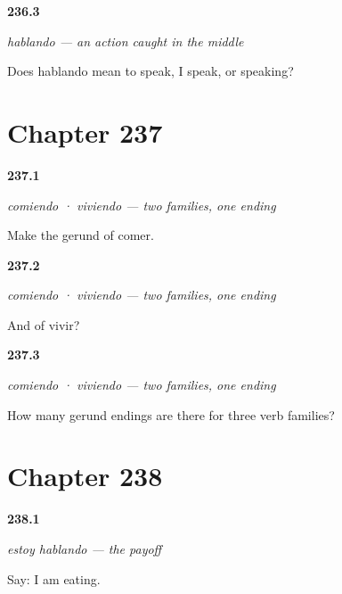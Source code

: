 \noindent\begin{minipage}[t]{\linewidth}
\raggedright
\hypertarget{review-ES-C62-hablando-mean}{\textbf{236.3}} \emph{hablando — an action caught in the middle}\par
\small Does hablando mean to speak, I speak, or speaking?
\end{minipage}\par\medskip

\section*{Chapter 237}

\noindent\begin{minipage}[t]{\linewidth}
\raggedright
\hypertarget{review-ES-C62-comiendo-er}{\textbf{237.1}} \emph{comiendo · viviendo — two families, one ending}\par
\small Make the gerund of comer.
\end{minipage}\par\medskip

\noindent\begin{minipage}[t]{\linewidth}
\raggedright
\hypertarget{review-ES-C62-comiendo-ir}{\textbf{237.2}} \emph{comiendo · viviendo — two families, one ending}\par
\small And of vivir?
\end{minipage}\par\medskip

\noindent\begin{minipage}[t]{\linewidth}
\raggedright
\hypertarget{review-ES-C62-comiendo-count}{\textbf{237.3}} \emph{comiendo · viviendo — two families, one ending}\par
\small How many gerund endings are there for three verb families?
\end{minipage}\par\medskip

\section*{Chapter 238}

\noindent\begin{minipage}[t]{\linewidth}
\raggedright
\hypertarget{review-ES-C62-estoy-hablando-say}{\textbf{238.1}} \emph{estoy hablando — the payoff}\par
\small Say: I am eating.
\end{minipage}\par\medskip

